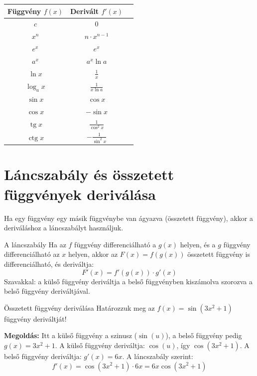 \documentclass[11pt,a4paper]{article}
\begin{document}
\begin{center}
\renewcommand{\arraystretch}{1.8}
\begin{tabular}{|c|c|c|}
    \hline


    \textbf{Függvény } $f(x)$ & \textbf{Derivált } $f'(x)$ \\ \hline
    $c$ & $0$ \\ \hline
    $x^n$ & $n \cdot x^{n-1}$ \\ \hline
    $e^x$ & $e^x$ \\ \hline
    $a^x$ & $a^x \ln a$ \\ \hline
    $\ln x$ & $\frac{1}{x}$ \\ \hline
    $\log_a x$ & $\frac{1}{x \ln a}$ \\ \hline
    $\sin x$ & $\cos x$ \\ \hline
    $\cos x$ & $-\sin x$ \\ \hline
    $\operatorname{tg} x$ & $\frac{1}{\cos^2 x}$ \\ \hline
    $\operatorname{ctg} x$ & $-\frac{1}{\sin^2 x}$ \\ \hline
\end{tabular}
\end{center}

\section{Láncszabály és összetett függvények deriválása}
Ha egy függvény egy másik függvénybe van ágyazva (összetett függvény), akkor a deriváláshoz a láncszabályt használjuk.

\begin{defbox}{A láncszabály}
Ha az $f$ függvény differenciálható a $g(x)$ helyen, és a $g$ függvény differenciálható az $x$ helyen, akkor az $F(x) = f(g(x))$ összetett függvény is differenciálható, és deriváltja:
\[
F'(x) = f'(g(x)) \cdot g'(x)
\]
Szavakkal: a külső függvény deriváltja a belső függvényben kiszámolva szorozva a belső függvény deriváltjával.
\end{defbox}

\begin{examplebox}{Összetett függvény deriválása}
Határozzuk meg az $f(x) = \sin(3x^2 + 1)$ függvény deriváltját!
\vspace{0.2cm}

\textbf{Megoldás:}
Itt a külső függvény a szinusz ($\sin(u)$), a belső függvény pedig $g(x) = 3x^2 + 1$.
A külső függvény deriváltja: $\cos(u)$, így $\cos(3x^2 + 1)$.
A belső függvény deriváltja: $g'(x) = 6x$.
A láncszabály szerint:
\[
f'(x) = \cos(3x^2 + 1) \cdot 6x = 6x \cos(3x^2 + 1)
\]
\end{examplebox}
\end{document}
